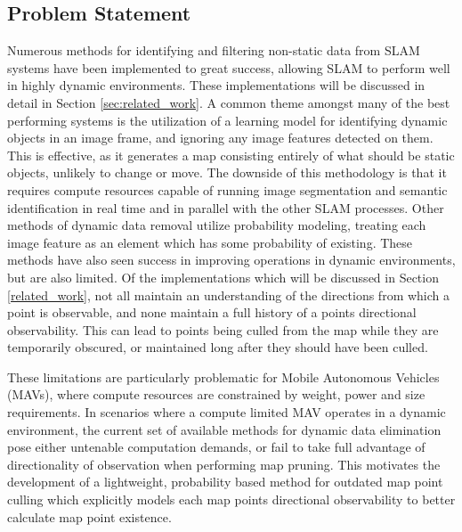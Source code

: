 \subsection{Problem Statement}




Numerous methods for identifying and filtering non-static data from SLAM systems have been implemented to great success, allowing SLAM to perform well in highly dynamic environments. These implementations will be discussed in detail in Section \ref{sec:related_work}. A common theme amongst many of the best performing systems is the utilization of a learning model for identifying dynamic objects in an image frame, and ignoring any image features detected on them. This is effective, as it generates a map consisting entirely of what should be static objects, unlikely to change or move. The downside of this methodology is that it requires compute resources capable of running image segmentation and semantic identification in real time and in parallel with the other SLAM processes. Other methods of dynamic data removal utilize probability modeling, treating each image feature as an element which has some probability of existing. These methods have also seen success in improving operations in dynamic environments, but are also limited. Of the implementations which will be discussed in Section \ref{related_work}, not all maintain an understanding of the directions from which a point is observable, and none maintain a full history of a points directional observability. This can lead to points being culled from the map while they are temporarily obscured, or maintained long after they should have been culled.

These limitations are particularly problematic for Mobile Autonomous Vehicles (MAVs), where compute resources are constrained by weight, power and size requirements. In scenarios where a compute limited MAV operates in a dynamic environment, the current set of available methods for dynamic data elimination pose either untenable computation demands, or fail to take full advantage of directionality of observation when performing map pruning. This motivates the development of a lightweight, probability based method for outdated map point culling which explicitly models each map points directional observability to better calculate map point existence.


